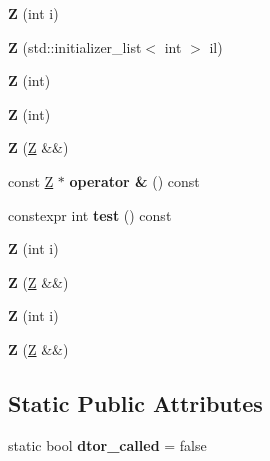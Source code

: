 \begin{DoxyCompactItemize}
{\bfseries Z} (int i)
\item 
\mbox{\label{struct_z_ae8e32461ae3a4118f0cc413a91899e34}} 
{\bfseries Z} (std\+::initializer\+\_\+list$<$ int $>$ il)
\item 
\mbox{\label{struct_z_a023e202cb9477d4eba41e74dcdc17e9d}} 
{\bfseries Z} (int)
\item 
\mbox{\label{struct_z_a023e202cb9477d4eba41e74dcdc17e9d}} 
{\bfseries Z} (int)
\item 
\mbox{\label{struct_z_ac53eb4bfb68c3fd654047e8aeb253d82}} 
{\bfseries Z} (\mbox{\hyperlink{struct_z}{Z}} \&\&)
\item 
\mbox{\label{struct_z_a1df855b3e886dd4b94a2ecbdc2975c99}} 
const \mbox{\hyperlink{struct_z}{Z}} $\ast$ {\bfseries operator \&} () const
\item 
\mbox{\label{struct_z_acd54c6ae37f3b303be07365c1a6df94a}} 
constexpr int {\bfseries test} () const
\item 
\mbox{\label{struct_z_a9adee188d04926f42b2d04dbc9ee561a}} 
{\bfseries Z} (int i)
\item 
\mbox{\label{struct_z_ac53eb4bfb68c3fd654047e8aeb253d82}} 
{\bfseries Z} (\mbox{\hyperlink{struct_z}{Z}} \&\&)
\item 
\mbox{\label{struct_z_a9adee188d04926f42b2d04dbc9ee561a}} 
{\bfseries Z} (int i)
\item 
\mbox{\label{struct_z_ac53eb4bfb68c3fd654047e8aeb253d82}} 
{\bfseries Z} (\mbox{\hyperlink{struct_z}{Z}} \&\&)
\end{DoxyCompactItemize}
\subsection*{Static Public Attributes}
\begin{DoxyCompactItemize}
\item 
\mbox{\label{struct_z_aeed570aa1617c443823c0dea79430351}} 
static bool {\bfseries dtor\+\_\+called} = false
\end{DoxyCompactItemize}
